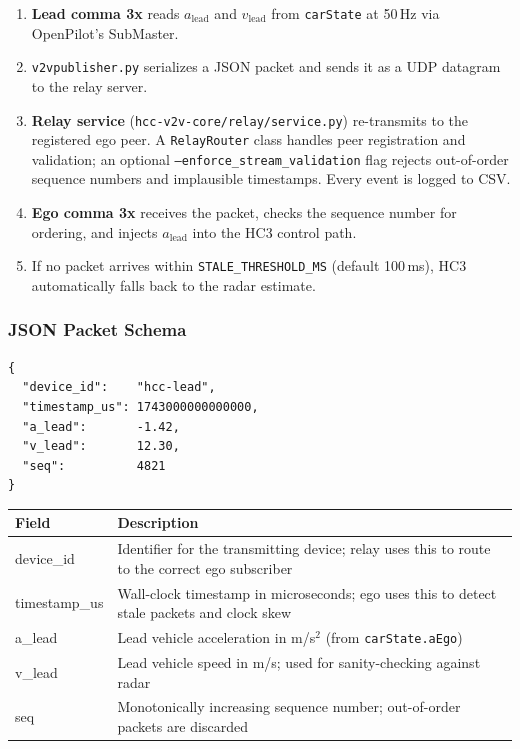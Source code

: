\documentclass[12pt]{article}
\begin{document}
\begin{enumerate}
  \item \textbf{Lead comma 3x} reads $a_{\text{lead}}$ and $v_{\text{lead}}$ from \texttt{carState} at 50\,Hz via OpenPilot's SubMaster.
  \item \texttt{v2vpublisher.py} serializes a JSON packet and sends it as a UDP datagram to the relay server.
  \item \textbf{Relay service} (\texttt{hcc-v2v-core/relay/service.py}) re-transmits to the registered ego peer. A \texttt{RelayRouter} class handles peer registration and validation; an optional \texttt{--enforce\_stream\_validation} flag rejects out-of-order sequence numbers and implausible timestamps. Every event is logged to CSV.
  \item \textbf{Ego comma 3x} receives the packet, checks the sequence number for ordering, and injects $a_{\text{lead}}$ into the HC3 control path.
  \item If no packet arrives within \texttt{STALE\_THRESHOLD\_MS} (default 100\,ms), HC3 automatically falls back to the radar estimate.
\end{enumerate}

\subsubsection{JSON Packet Schema}

\begin{verbatim}
{
  "device_id":    "hcc-lead",
  "timestamp_us": 1743000000000000,
  "a_lead":       -1.42,
  "v_lead":       12.30,
  "seq":          4821
}
\end{verbatim}

\begin{center}
\begin{tabular}{>{\ttfamily}p{3cm} p{8.5cm}}
  \toprule
  \textbf{Field} & \textbf{Description} \\
  \midrule
  device\_id     & Identifier for the transmitting device; relay uses this to route to the correct ego subscriber \\
  timestamp\_us  & Wall-clock timestamp in microseconds; ego uses this to detect stale packets and clock skew \\
  a\_lead        & Lead vehicle acceleration in m/s$^2$ (from \texttt{carState.aEgo}) \\
  v\_lead        & Lead vehicle speed in m/s; used for sanity-checking against radar \\
  seq            & Monotonically increasing sequence number; out-of-order packets are discarded \\
  \bottomrule
\end{tabular}
\end{center}
\end{document}
